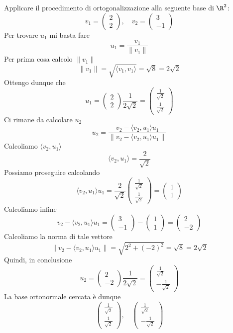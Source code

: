 \begin{example}
	Applicare il procedimento di ortogonalizzazione alla seguente base di $\R^2$:
	\[
		v_1 = \begin{pmatrix} 2 \\ 2 \end{pmatrix}, \quad
		v_2 = \begin{pmatrix} 3 \\ -1 \end{pmatrix}
	\]
	Per trovare $u_1$ mi basta fare
	\[
		u_1 = \frac{v_1}{\| v_1 \|}
	\]
	Per prima cosa calcolo $\| v_1 \|$
	\[ \| v_1 \| = \sqrt{\langle v_1, v_1 \rangle} = \sqrt{8} = 2 \sqrt{2} \]
	Ottengo dunque che
	\[
		u_1 = \begin{pmatrix}
			2 \\ 2
		\end{pmatrix} \frac{1}{2 \sqrt{2}} =
		\begin{pmatrix}
			\frac{1}{\sqrt{2}} \\ \frac{1}{\sqrt{2}}
		\end{pmatrix}
	\]
	Ci rimane da calcolare $u_2$
	\[
		u_2 = \frac{v_2 - \langle v_2, u_1 \rangle u_1}
		{\| v_2 - \langle v_2, u_1 \rangle u_1 \|}
	\]
	Calcoliamo $\langle v_2, u_1 \rangle$
	\[
		\langle v_2, u_1 \rangle = \frac{2}{\sqrt{2}}
	\]
	Possiamo proseguire calcolando
	\[
		\langle v_2, u_1 \rangle u_1 =
		\frac{2}{\sqrt{2}}
		\begin{pmatrix}
			\frac{1}{\sqrt{2}} \\ \frac{1}{\sqrt{2}}
		\end{pmatrix} =
		\begin{pmatrix}
			1 \\ 1
		\end{pmatrix}
	\]
	Calcoliamo infine
	\[
		v_2 - \langle v_2, u_1 \rangle u_1 =
		\begin{pmatrix} 3 \\ -1 \end{pmatrix} - \begin{pmatrix} 1 \\ 1 \end{pmatrix} =
		\begin{pmatrix} 2 \\ -2 \end{pmatrix}
	\]
	Calcoliamo la norma di tale vettore
	\[
		\| v_2 - \langle v_2, u_1 \rangle u_1 \| = \sqrt{ 2^2 + (-2)^2 } = \sqrt{8} = 2 \sqrt{2}
	\]
	Quindi, in conclusione
	\[
		u_2 = \begin{pmatrix} 2 \\ -2 \end{pmatrix} \frac{1}{2 \sqrt{2}} =
		\begin{pmatrix} \frac{1}{\sqrt{2}} \\ -\frac{1}{\sqrt{2}} \end{pmatrix}
	\]
	La base ortonormale cercata è dunque
	\[
		\begin{pmatrix} \frac{1}{\sqrt{2}} \\ \frac{1}{\sqrt{2}} \end{pmatrix}, \quad
		\begin{pmatrix} \frac{1}{\sqrt{2}} \\ -\frac{1}{\sqrt{2}} \end{pmatrix}
	\]
\end{example}
